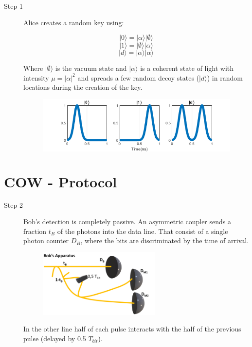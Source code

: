 \documentclass[40pt]{article}
\newcommand{\mysection}[1]{\section*{\color{black}\sffamily #1}}%
\begin{document}
\begin{description}
  \item[Step 1] Alice creates a random key using:  

$$|0\rangle = |\alpha\rangle |\emptyset\rangle$$      
  $$|1\rangle = |\emptyset\rangle |\alpha\rangle$$
$$|d\rangle = |\alpha\rangle |\alpha\rangle$$

Where $|\emptyset\rangle$ is the vacuum state and $|\alpha\rangle$ is a coherent state of light with intensity $\mu=|\alpha|^2$ and spreads a few random decoy states ($|d\rangle$) in random locations during the creation of the key.
      
  \begin{figure}[hbt]
    	\centering
    	\includegraphics{./figures/Simple.png}
        	\label{Simple}
    \end{figure}

\end{description}



\mysection{\Huge COW - Protocol}\Large

\begin{description}
  \item[Step 2] Bob's detection is completely passive. An asymmetric coupler sends a fraction $t_B$ of the photons into the data line. That consist of a single photon counter $D_B$, where the bits are discriminated by the time of arrival.

    
    \begin{figure}[hbt]
    	\centering
    	\includegraphics[width=0.6\textwidth]{./figures/Bob.pdf}
        	\label{bob}
    \end{figure}
In the other line half of each pulse interacts with the half of the previous pulse (delayed by 0.5 $T_{bit}$).
\end{description}  
\end{document}
